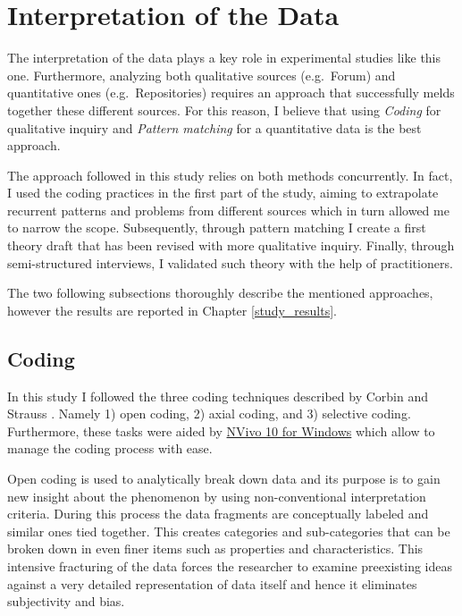 


%
%
%
%


%
%
%
%
\section{Interpretation of the Data} \label{data_interpretation}

The interpretation of the data plays a key role in experimental studies like this one. Furthermore, analyzing both qualitative sources (e.g.\ Forum) and quantitative ones (e.g.\ Repositories) requires an approach that successfully melds together these different sources. For this reason, I believe that using \textit{Coding} \cite{qualitative_inquiry} for qualitative inquiry and \textit{Pattern matching} \cite{case_study_guide} for a quantitative data is the best approach.

The approach followed in this study relies on both methods concurrently. In fact, I used the coding practices in the first part of the study, aiming to extrapolate recurrent patterns and problems from different sources which in turn allowed me to narrow the scope. Subsequently, through pattern matching I create a first theory draft that has been revised with more qualitative inquiry. Finally, through semi-structured interviews, I validated such theory with the help of practitioners.

The two following subsections thoroughly describe the mentioned approaches, however the results are reported in Chapter \ref{study_results}.

\subsection{Coding}
In this study I followed the three coding techniques described by Corbin and Strauss \cite{coding_guidelines}. Namely 1) open coding, 2) axial coding, and 3) selective coding. Furthermore, these tasks were aided by \href{http://www.qsrinternational.com/products_nvivo.aspx}{NVivo 10 for Windows} which allow to manage the coding process with ease.

Open coding is used to analytically break down data and its purpose is to gain new insight about the phenomenon by using non-conventional interpretation criteria. During this process the data fragments are conceptually labeled and similar ones tied together. This creates categories and sub-categories that can be broken down in even finer items such as properties and characteristics. This intensive fracturing of the data forces the researcher to examine preexisting ideas against a very detailed representation of data itself and hence it eliminates subjectivity and bias.

